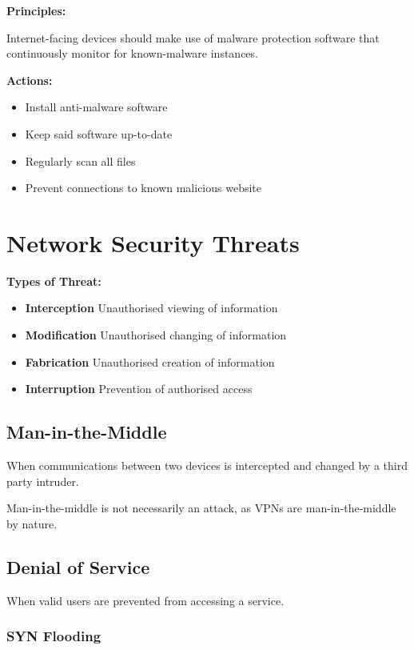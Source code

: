 \documentclass{article}
\begin{document}
\textbf{Principles:}

Internet-facing devices should make use of malware protection software that continuously monitor for known-malware instances.

\textbf{Actions:}

\begin{itemize}
\item 
  Install anti-malware software
\item 
  Keep said software up-to-date
\item 
  Regularly scan all files
\item 
  Prevent connections to known malicious website
\end{itemize}

\filbreak
\section{Network Security Threats}

\textbf{Types of Threat:}
\begin{itemize}
\item 
  \textbf{Interception}
  \subitem
  Unauthorised viewing of information
\item 
  \textbf{Modification}
  \subitem
  Unauthorised changing of information
\item 
  \textbf{Fabrication}
  \subitem
  Unauthorised creation of information
\item 
  \textbf{Interruption}
  \subitem
  Prevention of authorised access
\end{itemize}

\subsection{Man-in-the-Middle}

When communications between two devices is intercepted and changed by a third party intruder.

Man-in-the-middle is not necessarily an attack, as VPNs are man-in-the-middle by nature.

\subsection{Denial of Service}

When valid users are prevented from accessing a service.

\subsubsection{SYN Flooding}
\end{document}
